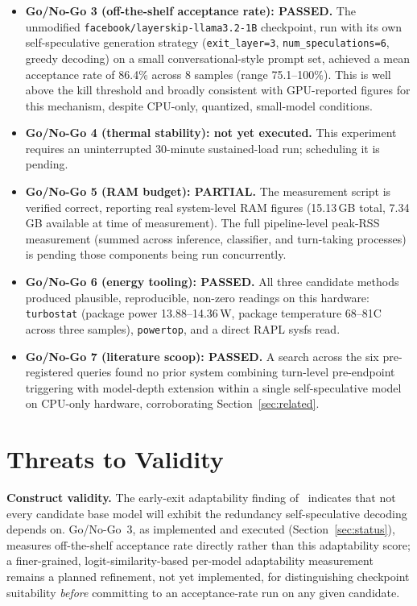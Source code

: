 \documentclass[journal]{IEEEtran}
\begin{document}
\begin{itemize}
    \item \textbf{Go/No-Go 3 (off-the-shelf acceptance rate): PASSED.} The unmodified \texttt{facebook/layerskip-llama3.2-1B} checkpoint, run with its own self-speculative generation strategy (\texttt{exit\_layer=3}, \texttt{num\_speculations=6}, greedy decoding) on a small conversational-style prompt set, achieved a mean acceptance rate of 86.4\% across 8 samples (range 75.1--100\%). This is well above the kill threshold and broadly consistent with GPU-reported figures for this mechanism, despite CPU-only, quantized, small-model conditions.
    \item \textbf{Go/No-Go 4 (thermal stability): not yet executed.} This experiment requires an uninterrupted 30-minute sustained-load run; scheduling it is pending.
    \item \textbf{Go/No-Go 5 (RAM budget): PARTIAL.} The measurement script is verified correct, reporting real system-level RAM figures (15.13\,GB total, 7.34\,GB available at time of measurement). The full pipeline-level peak-RSS measurement (summed across inference, classifier, and turn-taking processes) is pending those components being run concurrently.
    \item \textbf{Go/No-Go 6 (energy tooling): PASSED.} All three candidate methods produced plausible, reproducible, non-zero readings on this hardware: \texttt{turbostat} (package power 13.88--14.36\,W, package temperature 68--81\textdegree{}C across three samples), \texttt{powertop}, and a direct RAPL sysfs read.
    \item \textbf{Go/No-Go 7 (literature scoop): PASSED.} A search across the six pre-registered queries found no prior system combining turn-level pre-endpoint triggering with model-depth extension within a single self-speculative model on CPU-only hardware, corroborating Section~\ref{sec:related}.
\end{itemize}

\section{Threats to Validity}

\textbf{Construct validity.} The early-exit adaptability finding of~\cite{wei2026diminishing} indicates that not every candidate base model will exhibit the redundancy self-speculative decoding depends on. Go/No-Go~3, as implemented and executed (Section~\ref{sec:status}), measures off-the-shelf acceptance rate directly rather than this adaptability score; a finer-grained, logit-similarity-based per-model adaptability measurement remains a planned refinement, not yet implemented, for distinguishing checkpoint suitability \emph{before} committing to an acceptance-rate run on any given candidate.
\end{document}

